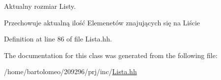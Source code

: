 Aktualny rozmiar Listy. 

Przechowuje aktualną ilość Elemenetów znajujących się na Liście 

Definition at line 86 of file Lista.\-hh.



The documentation for this class was generated from the following file\-:\begin{DoxyCompactItemize}
\item 
/home/bartolomeo/209296/prj/inc/\hyperlink{_lista_8hh}{Lista.\-hh}\end{DoxyCompactItemize}

